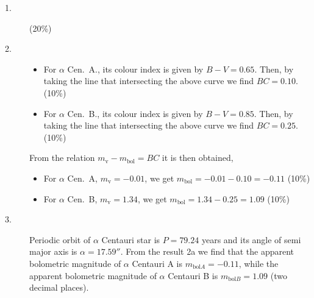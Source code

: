 \begin{description}
  \item[1.] 
  \hfill(20\%)

  \item[2.] 

  \begin{itemize}
  \item For $\alpha$ Cen.\ A., its colour index is given by $B-V = 0.65$.
    Then, by taking the line that intersecting the above curve we find
    $BC = 0.10$. \hfill(10\%)
  \item For $\alpha$ Cen.\ B., its colour index is given by $B-V = 0.85$.
    Then, by taking the line that intersecting the above curve we find
    $BC = 0.25$. \hfill(10\%)
  \end{itemize}
  From the relation $m_{\mathrm{v}} - m_{\mathrm{bol}} = BC$ it is then
  obtained,
  \begin{itemize}
  \item For $\alpha$ Cen.\ A, $m_{\mathrm{v}} = -0.01$, we get
    $m_{\mathrm{bol}} = -0.01 - 0.10 = -0.11$ \hfill(10\%)
  \item For $\alpha$ Cen.\ B, $m_{\mathrm{v}} = 1.34$, we get
    $m_{\mathrm{bol}} = 1.34 - 0.25 = 1.09$ \hfill(10\%)
  \end{itemize}

\item[3.] Periodic orbit of $\alpha$ Centauri star is $P = 79.24$ years and
  its angle of semi major axis is $\alpha = 17.59''$. From the result 2a we
  find that the apparent bolometric magnitude of $\alpha$ Centauri A is
  $m_{\mathrm{bol}A} = -0.11$, while the apparent bolometric magnitude of
  $\alpha$ Centauri B is $m_{\mathrm{bol}B} = 1.09$ (two decimal places).


\end{description}

